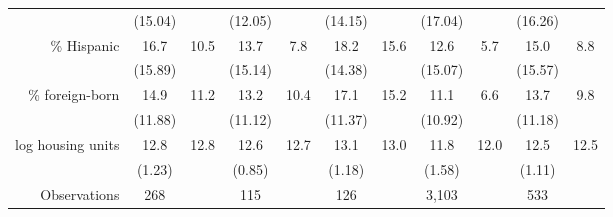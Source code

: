 \begin{tabular}{r*{5}{c}*{5}{c}}
                    &     (15.04)&            &     (12.05)&            &     (14.15)&            &     (17.04)&            &     (16.26)&            \\
\% Hispanic         &        16.7&        10.5&        13.7&         7.8&        18.2&        15.6&        12.6&         5.7&        15.0&         8.8\\
                    &     (15.89)&            &     (15.14)&            &     (14.38)&            &     (15.07)&            &     (15.57)&            \\
\% foreign-born     &        14.9&        11.2&        13.2&        10.4&        17.1&        15.2&        11.1&         6.6&        13.7&         9.8\\
                    &     (11.88)&            &     (11.12)&            &     (11.37)&            &     (10.92)&            &     (11.18)&            \\
log housing units   &        12.8&        12.8&        12.6&        12.7&        13.1&        13.0&        11.8&        12.0&        12.5&        12.5\\
                    &      (1.23)&            &      (0.85)&            &      (1.18)&            &      (1.58)&            &      (1.11)&            \\
\midrule
Observations        &         268&            &         115&            &         126&            &       3,103&            &         533&            \\
\bottomrule \end{tabular}
